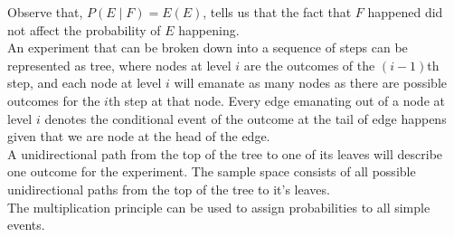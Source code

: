 Observe that, $P(E \mid F) = E(E)$, tells us that the fact that $F$ happened did not affect the probability of $E$ happening. 
\\


An experiment that can be broken down into a sequence of steps can be represented as tree, where nodes at level $i$ are the outcomes of the $(i-1)$th step, and each node at level $i$ will emanate as many nodes as there are possible outcomes for the $i$th step at that node. Every edge emanating out of a node at level $i$ denotes the conditional event of the outcome at the tail of edge happens given that we are node at the head of the edge. 
\\
A unidirectional path from the top of the tree to one of its leaves will describe one outcome for the experiment. The sample space consists of all possible unidirectional paths from the top of the tree to it's leaves. 
\\
The multiplication principle can be used to assign probabilities to all simple events. 
